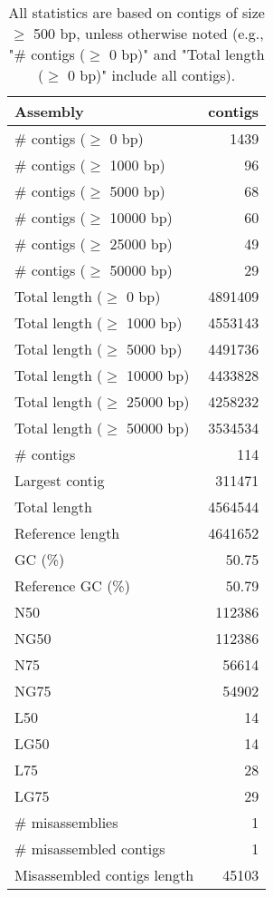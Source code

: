 \documentclass[12pt,a4paper]{article}
\begin{document}
\begin{table}[ht]
\begin{center}
\caption{All statistics are based on contigs of size $\geq$ 500 bp, unless otherwise noted (e.g., "\# contigs ($\geq$ 0 bp)" and "Total length ($\geq$ 0 bp)" include all contigs).}
\begin{tabular}{|l*{1}{|r}|}
\hline
Assembly & contigs \\ \hline
\# contigs ($\geq$ 0 bp) & 1439 \\ \hline
\# contigs ($\geq$ 1000 bp) & 96 \\ \hline
\# contigs ($\geq$ 5000 bp) & 68 \\ \hline
\# contigs ($\geq$ 10000 bp) & 60 \\ \hline
\# contigs ($\geq$ 25000 bp) & 49 \\ \hline
\# contigs ($\geq$ 50000 bp) & 29 \\ \hline
Total length ($\geq$ 0 bp) & 4891409 \\ \hline
Total length ($\geq$ 1000 bp) & 4553143 \\ \hline
Total length ($\geq$ 5000 bp) & 4491736 \\ \hline
Total length ($\geq$ 10000 bp) & 4433828 \\ \hline
Total length ($\geq$ 25000 bp) & 4258232 \\ \hline
Total length ($\geq$ 50000 bp) & 3534534 \\ \hline
\# contigs & 114 \\ \hline
Largest contig & 311471 \\ \hline
Total length & 4564544 \\ \hline
Reference length & 4641652 \\ \hline
GC (\%) & 50.75 \\ \hline
Reference GC (\%) & 50.79 \\ \hline
N50 & 112386 \\ \hline
NG50 & 112386 \\ \hline
N75 & 56614 \\ \hline
NG75 & 54902 \\ \hline
L50 & 14 \\ \hline
LG50 & 14 \\ \hline
L75 & 28 \\ \hline
LG75 & 29 \\ \hline
\# misassemblies & 1 \\ \hline
\# misassembled contigs & 1 \\ \hline
Misassembled contigs length & 45103 \\ \hline

\end{tabular}
\end{center}
\end{table}
\end{document}
